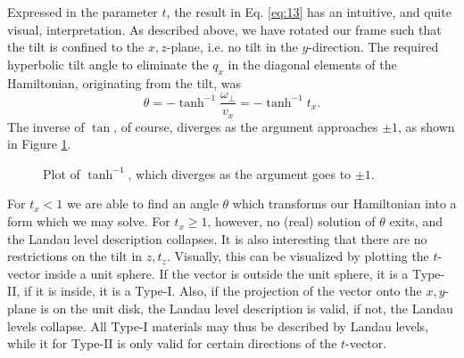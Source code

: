 Expressed in the parameter \(t\), the result in Eq. \eqref{eq:13} has an intuitive, and quite visual, interpretation.
As described above, we have rotated our frame such that the tilt is confined to the \(x,z\)-plane, i.e. no tilt in the \(y\)-direction.
The required hyperbolic tilt angle to eliminate the \(q_{x}\) in the diagonal elements of the Hamiltonian, originating from the tilt, was
\begin{equation}
  \label{eq:15}
  \theta = - \tanh^{-1} \frac{\omega_{\perp}}{v_{x}} = - \tanh^{-1} t_{x}.
\end{equation}
The inverse of \(\tan \), of course, diverges as the argument approaches \(\pm 1\), as shown in Figure \ref{fig:arctanh}.
\begin{figure}[ht]
  \centering
  \caption{\label{fig:arctanh} Plot of \(\tanh^{-1}\), which diverges as the argument goes to \(\pm 1\).}
\end{figure}
For \(t_{x} < 1\) we are able to find an angle \(\theta \) which transforms our Hamiltonian into a form which we may solve.
For \(t_{x} \geq 1\), however, no (real) solution of \(\theta \) exits, and the Landau level description collapses.
It is also interesting that there are no restrictions on the tilt in \(z, t_{z}\).
Visually, this can be visualized by plotting the \(t\)-vector inside a unit sphere.
If the vector is outside the unit sphere, it is a Type-II, if it is inside, it is a Type-I.
Also, if the projection of the vector onto the \(x,y\)-plane is on the unit disk, the Landau level description is valid, if not, the Landau levels collapse.
All Type-I materials may thus be described by Landau levels, while it for Type-II is only valid for certain directions of the \(t\)-vector.
